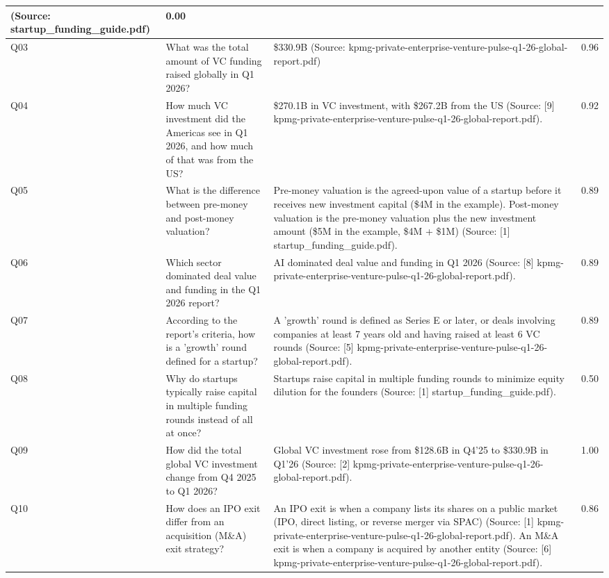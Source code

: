 \documentclass[11pt, a4paper]{article}
\begin{document}
\begin{table}[H]
\begin{tabularx}{\textwidth}{|l|X|X|c|}
(Source: startup\_funding\_guide.pdf) & 0.00 \\
\hline
Q03 & What was the total amount of VC funding raised globally in Q1 2026? & \$330.9B (Source: kpmg-private-enterprise-venture-pulse-q1-26-global-report.pdf) & 0.96 \\
\hline
Q04 & How much VC investment did the Americas see in Q1 2026, and how much of that was from the US? & \$270.1B in VC investment, with \$267.2B from the US (Source: [9] kpmg-private-enterprise-venture-pulse-q1-26-global-report.pdf). & 0.92 \\
\hline
Q05 & What is the difference between pre-money and post-money valuation? & Pre-money valuation is the agreed-upon value of a startup before it receives new investment capital (\$4M in the example). Post-money valuation is the pre-money valuation plus the new investment amount (\$5M in the example, \$4M + \$1M) (Source: [1] startup\_funding\_guide.pdf). & 0.89 \\
\hline
Q06 & Which sector dominated deal value and funding in the Q1 2026 report? & AI dominated deal value and funding in Q1 2026 (Source: [8] kpmg-private-enterprise-venture-pulse-q1-26-global-report.pdf). & 0.89 \\
\hline
Q07 & According to the report's criteria, how is a 'growth' round defined for a startup? & A 'growth' round is defined as Series E or later, or deals involving companies at least 7 years old and having raised at least 6 VC rounds (Source: [5] kpmg-private-enterprise-venture-pulse-q1-26-global-report.pdf). & 0.89 \\
\hline
Q08 & Why do startups typically raise capital in multiple funding rounds instead of all at once? & Startups raise capital in multiple funding rounds to minimize equity dilution for the founders (Source: [1] startup\_funding\_guide.pdf). & 0.50 \\
\hline
Q09 & How did the total global VC investment change from Q4 2025 to Q1 2026? & Global VC investment rose from \$128.6B in Q4'25 to \$330.9B in Q1'26 (Source: [2] kpmg-private-enterprise-venture-pulse-q1-26-global-report.pdf). & 1.00 \\
\hline
Q10 & How does an IPO exit differ from an acquisition (M\&A) exit strategy? & An IPO exit is when a company lists its shares on a public market (IPO, direct listing, or reverse merger via SPAC) (Source: [1] kpmg-private-enterprise-venture-pulse-q1-26-global-report.pdf). An M\&A exit is when a company is acquired by another entity (Source: [6] kpmg-private-enterprise-venture-pulse-q1-26-global-report.pdf). & 0.86 \\

\end{tabularx}
\end{table}
\end{document}

